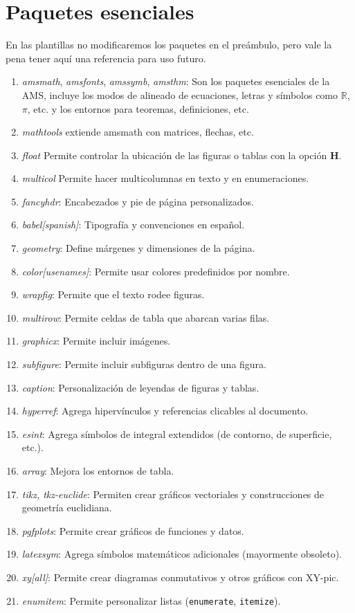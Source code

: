 \documentclass[graybox,envcountchap,sectrefs]{svmono}
\begin{document}
\section{Paquetes esenciales}       
    En las plantillas no modificaremos los paquetes en el preámbulo, pero vale la pena tener aquí una referencia
    para uso futuro.
    \begin{enumerate}[label=\roman*.]
        \item \emph{amsmath}, \emph{amsfonts}, \emph{amssymb}, \emph{amsthm}: Son los paquetes esenciales de la AMS,
            incluye los modos de alineado de ecuaciones, letras y símbolos como \(\mathbb{R}\), \(\pi\), etc.
            y los entornos para teoremas, definiciones, etc.
        \item \emph{mathtools} extiende amsmath con matrices, flechas, etc.
        \item \emph{float} Permite controlar la ubicación de las figuras o tablas con la opción \textbf{H}.
        \item \emph{multicol} Permite hacer multicolumnas en texto y en enumeraciones.
        \item \emph{fancyhdr}: Encabezados y pie de página personalizados.
        \item \emph{babel[spanish]}: Tipografía y convenciones en español.
        \item \emph{geometry}: Define márgenes y dimensiones de la página.
    \item \emph{color[usenames]}: Permite usar colores predefinidos por nombre.
    \item \emph{wrapfig}: Permite que el texto rodee figuras.
    \item \emph{multirow}: Permite celdas de tabla que abarcan varias filas.
    \item \emph{graphicx}: Permite incluir imágenes.
    \item \emph{subfigure}: Permite incluir subfiguras dentro de una figura.
    \item \emph{caption}: Personalización de leyendas de figuras y tablas.
    \item \emph{hyperref}: Agrega hipervínculos y referencias clicables al documento.
    \item \emph{esint}: Agrega símbolos de integral extendidos (de contorno, de superficie, etc.).
    \item \emph{array}: Mejora los entornos de tabla.
    \item \emph{tikz, tkz-euclide}: Permiten crear gráficos vectoriales y construcciones de geometría euclidiana.
    \item \emph{pgfplots}: Permite crear gráficos de funciones y datos.
    \item \emph{latexsym}: Agrega símbolos matemáticos adicionales (mayormente obsoleto).
    \item \emph{xy[all]}: Permite crear diagramas conmutativos y otros gráficos con XY-pic.
    \item \emph{enumitem}: Permite personalizar listas (\texttt{enumerate}, \texttt{itemize}).
    \end{enumerate}
\end{document}
